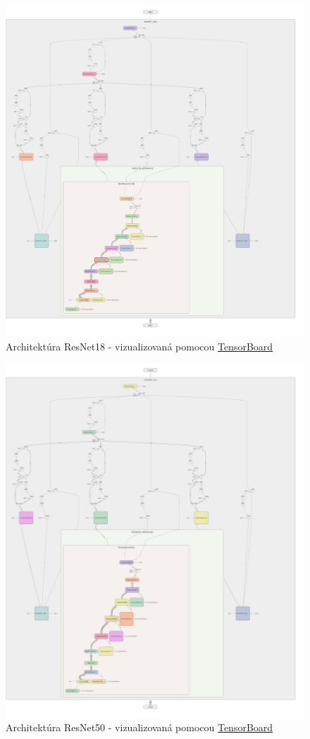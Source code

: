 \documentclass[a4paper, 11pt]{article}
\begin{document}
\begin{figure}
    \centering
    \includegraphics[width=1\linewidth]{images/png (4).png}
    \caption{Architektúra ResNet18 - vizualizovaná pomocou \href{https://pytorch.org/tutorials/intermediate/tensorboard_tutorial.html}{TensorBoard}}
    \label{fig:enter-label}
\end{figure}

\begin{figure}
    \centering
    \includegraphics[width=1\linewidth]{images/png (6).png}
    \caption{Architektúra ResNet50 - vizualizovaná pomocou \href{https://pytorch.org/tutorials/intermediate/tensorboard_tutorial.html}{TensorBoard}}
    \label{fig:enter-label}
\end{figure}
\end{document}
